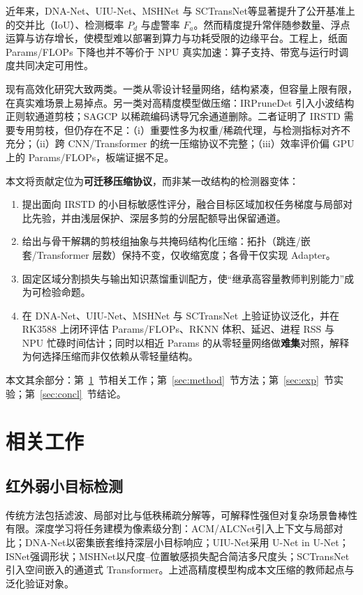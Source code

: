 \documentclass[lettersize,journal]{IEEEtran}
\begin{document}
近年来，DNA-Net\cite{DNANet2023}、UIU-Net\cite{UIUNet2023}、MSHNet\cite{MSHNet2024} 与 SCTransNet\cite{SCTransNet2024}等显著提升了公开基准上的交并比（IoU）、检测概率 $P_d$ 与虚警率 $F_a$。然而精度提升常伴随参数量、浮点运算与访存增长，使模型难以部署到算力与功耗受限的边缘平台。工程上，纸面 Params/FLOPs 下降也并不等价于 NPU 真实加速：算子支持、带宽与运行时调度共同决定可用性。

现有高效化研究大致两类。一类从零设计轻量网络\cite{RDIAN2023,LWIRSTNet2023,RepISDNet2023,L2SKNet2025}，结构紧凑，但容量上限有限，在真实难场景上易掉点。另一类对高精度模型做压缩：IRPruneDet\cite{IRPruneDet2024} 引入小波结构正则软通道剪枝；SAGCP\cite{SAGCP2025} 以稀疏编码诱导冗余通道删除。二者证明了 IRSTD 需要专用剪枝，但仍存在不足：（i）重要性多为权重/稀疏代理，与检测指标对齐不充分；（ii）跨 CNN/Transformer 的统一压缩协议不完整；（iii）效率评价偏 GPU 上的 Params/FLOPs，板端证据不足。

本文将贡献定位为\textbf{可迁移压缩协议}，而非某一改结构的检测器变体：
\begin{enumerate}
\item 提出面向 IRSTD 的小目标敏感性评分，融合目标区域加权任务梯度与局部对比先验，并由浅层保护、深层多剪的分层配额导出保留通道。
\item 给出与骨干解耦的剪枝组抽象与共掩码结构化压缩：拓扑（跳连/嵌套/Transformer 层数）保持不变，仅收缩宽度；各骨干仅实现 Adapter。
\item 固定区域分割损失与输出知识蒸馏重训配方，使“继承高容量教师判别能力”成为可检验命题。
\item 在 DNA-Net、UIU-Net、MSHNet 与 SCTransNet 上验证协议泛化，并在 RK3588 上闭环评估 Params/FLOPs、RKNN 体积、延迟、进程 RSS 与 NPU 忙碌时间估计；同时以相近 Params 的从零轻量网络做\textbf{难集}对照，解释为何选择压缩而非仅依赖从零轻量结构。
\end{enumerate}

本文其余部分：第~\ref{sec:related}~节相关工作；第~\ref{sec:method}~节方法；第~\ref{sec:exp}~节实验；第~\ref{sec:concl}~节结论。

\section{相关工作}
\label{sec:related}

\subsection{红外弱小目标检测}
传统方法包括滤波、局部对比与低秩稀疏分解等\cite{IPI2013}，可解释性强但对复杂场景鲁棒性有限。深度学习将任务建模为像素级分割：ACM/ALCNet\cite{ACM2021,ALCNet2021}引入上下文与局部对比；DNA-Net\cite{DNANet2023}以密集嵌套维持深层小目标响应；UIU-Net\cite{UIUNet2023}采用 U-Net in U-Net；ISNet\cite{ISNet2022}强调形状；MSHNet\cite{MSHNet2024}以尺度--位置敏感损失配合简洁多尺度头；SCTransNet\cite{SCTransNet2024}引入空间嵌入的通道式 Transformer。上述高精度模型构成本文压缩的教师起点与泛化验证对象。
\end{document}
